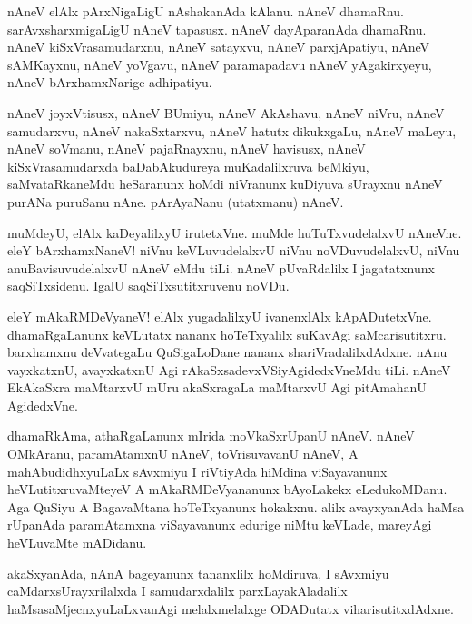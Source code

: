 \begin{mng}
nAneV elAlx pArxNigaLigU nAshakanAda kAlanu. nAneV dhamaRnu. sarAvxsharxmigaLigU nAneV tapasusx. nAneV dayAparanAda dhamaRnu. nAneV kiSxVrasamudarxnu, nAneV satayxvu, nAneV parxjApatiyu, nAneV sAMKayxnu, nAneV yoVgavu, nAneV paramapadavu nAneV yAgakirxyeyu, nAneV bArxhamxNarige adhipatiyu.
\end{mng}

\begin{mng}
nAneV joyxVtisusx, nAneV BUmiyu, nAneV AkAshavu, nAneV niVru, nAneV samudarxvu, nAneV nakaSxtarxvu, nAneV hatutx dikukxgaLu, nAneV maLeyu, nAneV soVmanu, nAneV pajaRnayxnu, nAneV havisusx, nAneV kiSxVrasamudarxda baDabAkudureya muKadalilxruva beMkiyu, saMvataRkaneMdu heSaranunx hoMdi niVranunx kuDiyuva sUrayxnu nAneV purANa puruSanu nAne. pArAyaNanu (utatxmanu) nAneV.
\end{mng}

\begin{mng}
muMdeyU, elAlx kaDeyalilxyU irutetxVne. muMde huTuTxvudelalxvU nAneVne. eleY bArxhamxNaneV! niVnu keVLuvudelalxvU niVnu noVDuvudelalxvU, niVnu anuBavisuvudelalxvU nAneV eMdu tiLi. nAneV pUvaRdalilx I jagatatxnunx saqSiTxsidenu. IgalU saqSiTxsutitxruvenu noVDu.
\end{mng}

\begin{mng}
eleY mAkaRMDeVyaneV! elAlx yugadalilxyU ivanenxlAlx kApADutetxVne. dhamaRgaLanunx keVLutatx nananx hoTeTxyalilx suKavAgi saMcarisutitxru. barxhamxnu deVvategaLu QuSigaLoDane nananx shariVradalilxdAdxne. nAnu vayxkatxnU, avayxkatxnU Agi rAkaSxsadevxVSiyAgidedxVneMdu tiLi. nAneV EkAkaSxra maMtarxvU mUru akaSxragaLa maMtarxvU Agi pitAmahanU AgidedxVne.
\end{mng}

\begin{mng}
dhamaRkAma, athaRgaLanunx mIrida moVkaSxrUpanU nAneV. nAneV OMkAranu, paramAtamxnU nAneV, toVrisuvavanU nAneV, A mahAbudidhxyuLaLx sAvxmiyu I riVtiyAda hiMdina viSayavanunx heVLutitxruvaMteyeV A mAkaRMDeVyananunx bAyoLakekx eLedukoMDanu. Aga QuSiyu A BagavaMtana hoTeTxyanunx hokakxnu. alilx avayxyanAda haMsa rUpanAda paramAtamxna viSayavanunx edurige niMtu keVLade, mareyAgi heVLuvaMte mADidanu.
\end{mng}

\begin{mng}
akaSxyanAda, nAnA bageyanunx tananxlilx hoMdiruva, I sAvxmiyu caMdarxsUrayxrilalxda I samudarxdalilx parxLayakAladalilx haMsasaMjecnxyuLaLxvanAgi melalxmelalxge ODADutatx viharisutitxdAdxne.
\end{mng}

